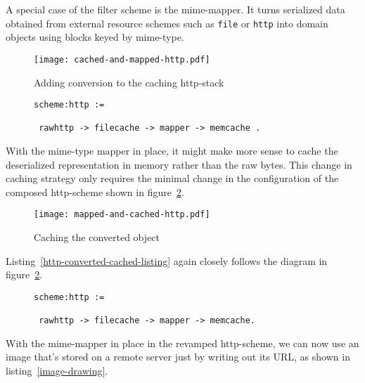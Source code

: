 \documentclass[preprint,authoryear]{acm_proc_article-sp}
\begin{document}
 A special case of the 
filter scheme is the mime-mapper.  It turns serialized data obtained from
external resource schemes such as {\tt file} or {\tt http} into domain objects
using blocks keyed by mime-type.  

\begin{figure}[htbp]
\begin{center}
\texttt{[image: cached-and-mapped-http.pdf]}
\caption{Adding conversion to the caching http-stack}
\label{http-cached-converted}
\end{center}
\end{figure}

\begin{figure}[htbp]
\begin{lstlisting}[style=L,label=http-cached-converted-listing,caption=Converting and caching.]
scheme:http := 

 rawhttp -> filecache -> mapper -> memcache .
\end{lstlisting}
\end{figure}


With the mime-type mapper in place, it might make more sense to
cache the deserialized representation in memory rather than
the raw bytes.  This change in caching strategy only requires
the minimal change in the configuration of the composed http-scheme
shown in figure~\ref{http-converted-cached}.

\begin{figure}[htbp]
\caption{Caching the converted object}
\begin{center}
\texttt{[image: mapped-and-cached-http.pdf]}
\end{center}
\label{http-converted-cached}
\end{figure}

Listing~\ref{http-converted-cached-listing} again closely follows the
diagram in figure~\ref{http-converted-cached}.

\begin{figure}[htbp]
\begin{lstlisting}[style=L,label=http-converted-cached-listing,caption=Converting and caching.]
scheme:http := 

 rawhttp -> filecache -> mapper -> memcache.
\end{lstlisting}
\end{figure}

With the mime-mapper in place in the revamped http-scheme, we can now use 
an image that's stored on a remote server just by writing out its URL, as shown
in listing~\ref{image-drawing}.
\end{document}
